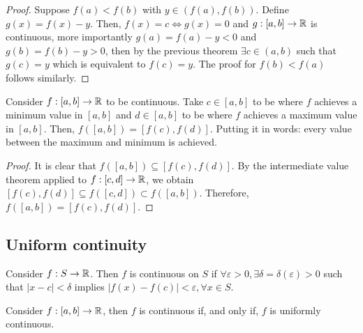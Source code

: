 \begin{proof}
    Suppose $f(a) < f(b)$ with $y \in (f(a), f(b))$. Define $g(x) = f(x) - y$. Then, $f(x) = c \Longleftrightarrow g(x) = 0$ and $g: [a,b] \to \mathbb{R}$ is continuous, more importantly $g(a) = f(a) - y < 0$ and $g(b) = f(b) - y > 0$, then by the previous theorem $\exists c \in (a,b)$ such that $g(c) = y$ which is equivalent to $f(c) = y$. The proof for $f(b)<f(a)$ follows similarly.
\end{proof}

\begin{theorem}
    Consider $f: [a,b]  \to \mathbb{R}$ to be continuous. Take $c \in [a,b]$ to be where $f$ achieves a minimum value in $[a,b]$ and $d \in [a,b]$ to be where $f$ achieves a maximum value in $[a,b]$. Then, $f([a,b]) = [f(c), f(d)]$. Putting it in words: every value between the maximum and minimum is achieved.
\end{theorem}

\begin{proof}
    It is clear that $f([a,b]) \subseteq [f(c), f(d)]$. By the intermediate value theorem applied to $f: [c,d] \to \mathbb{R}$, we obtain $[f(c), f(d)] \subseteq f([c,d]) \subset f([a,b])$. Therefore, $f([a,b]) = [f(c), f(d)]$.
\end{proof}

\subsection{Uniform continuity}

\begin{definition}
    Consider $f: S \to \mathbb{R}$. Then $f$ is continuous on $S$ if $\forall \varepsilon > 0, \exists \delta = \delta(\varepsilon) > 0$ such that $|x-c| < \delta$ implies $|f(x) - f(c)| < \varepsilon, \forall x \in S$.    
\end{definition}

\begin{theorem}
    Consider $f: [a,b] \to \mathbb{R}$, then $f$ is continuous if, and only if, $f$ is uniformly continuous.
\end{theorem}

